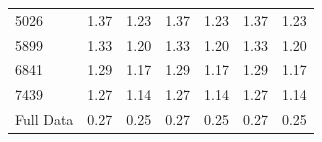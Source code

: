 \begin{table}[!htb]
{\begin{tabular}{l||rr|rr|rr}
        5026        &         1.37 &      1.23 &             1.37 &          1.23 &        1.37 &     1.23 \\
        5899        &         1.33 &      1.20 &             1.33 &          1.20 &        1.33 &     1.20 \\
        6841        &         1.29 &      1.17 &             1.29 &          1.17 &        1.29 &     1.17 \\
        7439        &         1.27 &      1.14 &             1.27 &          1.14 &        1.27 &     1.14 \\
        Full Data       &         0.27 &      0.25 &             0.27 &          0.25 &        0.27 &     0.25 \\
        \bottomrule
        \end{tabular}
        }
        \end{table}
        
